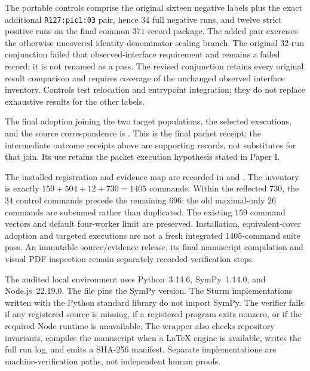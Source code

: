 The portable controls comprise the original sixteen negative labels
plus the exact additional \texttt{R127:pic1:03} pair, hence $34$ full
negative runs, and twelve strict positive runs on the final common
$371$-record package. The added pair exercises the otherwise uncovered
identity-denominator scaling branch. The original $32$-run conjunction
failed that observed-interface requirement and remains a failed record;
it is not renamed as a pass. The revised conjunction retains every
original result comparison and requires coverage of the unchanged
observed interface inventory. Controls test relocation and entrypoint
integration; they do not replace exhaustive results for the other labels.

The final adoption joining the two target populations, the selected
executions, and the source correspondence is
.
This is the final packet receipt; the intermediate outcome receipts above
are supporting records, not substitutes for that join. Its use retains the
packet execution hypothesis stated in Paper I.

The installed registration and evidence map are recorded in
 and
.
The inventory is exactly $159+504+12+730=1405$ commands. Within the
reflected $730$, the $34$ control commands precede the remaining $696$;
the old maximal-only $26$ commands are subsumed rather than duplicated.
The existing $159$ command vectors and default four-worker limit are
preserved. Installation, equivalent-cover adoption and targeted
executions are not a fresh integrated $1405$-command suite pass.
An immutable source/evidence release, its final manuscript compilation
and visual PDF inspection remain separately recorded verification steps.

The audited local environment uses Python~3.14.6, SymPy~1.14.0, and
Node.js~22.19.0.  The file  pins the SymPy version.
The Sturm implementations written with the Python standard library do not
import SymPy.  The verifier
 fails if any registered source is missing,
if a registered program exits nonzero, or if the required Node runtime is
unavailable.  The wrapper  also checks repository
invariants, compiles the manuscript when a LaTeX engine is available, writes
the full run log, and emits a SHA-256 manifest.  Separate implementations are
machine-verification paths, not independent human proofs.

